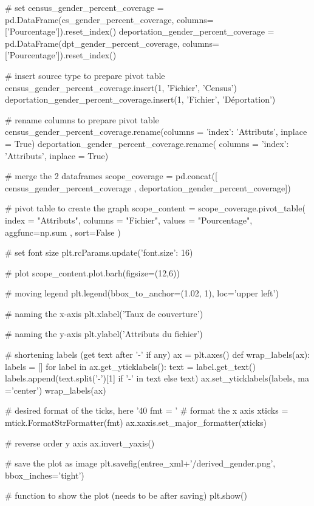 \documentclass[a4paper,12pt,twoside]{book}
\begin{document}
\begin{python}
# set %
census_gender_percent_coverage = pd.DataFrame(cs_gender_percent_coverage, columns=['Pourcentage']).reset_index()
deportation_gender_percent_coverage = pd.DataFrame(dpt_gender_percent_coverage, columns=['Pourcentage']).reset_index()

# insert source type to prepare pivot table
census_gender_percent_coverage.insert(1, 'Fichier', 'Census')
deportation_gender_percent_coverage.insert(1, 'Fichier', 'Déportation')

# rename columns to prepare pivot table
census_gender_percent_coverage.rename(columns = {'index': 'Attributs'}, inplace = True)
deportation_gender_percent_coverage.rename( columns = {'index': 'Attributs'}, inplace = True)

# merge the 2 dataframes
scope_coverage = pd.concat([ census_gender_percent_coverage , deportation_gender_percent_coverage])

# pivot table to create the graph
scope_content = scope_coverage.pivot_table( index = "Attributs", columns = "Fichier", values = "Pourcentage", aggfunc=np.sum , sort=False )

# set font size
plt.rcParams.update({'font.size': 16})

# plot %
scope_content.plot.barh(figsize=(12,6))

# moving legend
plt.legend(bbox_to_anchor=(1.02, 1), loc='upper left')

# naming the x-axis
plt.xlabel('Taux de couverture')

# naming the y-axis
plt.ylabel('Attributs du fichier')

# shortening labels (get text after '-' if any)
ax = plt.axes()
def wrap_labels(ax):
    labels = []
    for label in ax.get_yticklabels():
        text = label.get_text()
        labels.append(text.split('-')[1] if '-' in text else text)
    ax.set_yticklabels(labels, ma ='center')
wrap_labels(ax)

# desired format of the ticks, here '40%
fmt = '%
# format the x axis
xticks = mtick.FormatStrFormatter(fmt)
ax.xaxis.set_major_formatter(xticks)

# reverse order y axis
ax.invert_yaxis()

# save the plot as image
plt.savefig(entree_xml+'/derived_gender.png', bbox_inches='tight')

# function to show the plot (needs to be after saving)
plt.show()
            \end{python}
\end{document}
